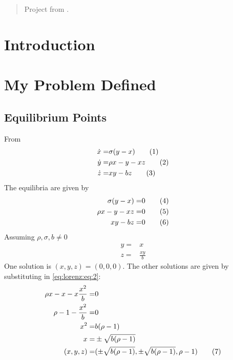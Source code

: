 \documentclass[]{article}
\title{}
\author{}
\newcommand\numberthis{\addtocounter{equation}{1}\tag{\theequation}}
\begin{document}
\maketitle

\begin{abstract}
Project  from \cite{ChaosBook}.
\end{abstract}

\tableofcontents

\section{Introduction}



\section{My Problem Defined}

\subsection{Equilibrium Points}
From \cite{lorenz1963deterministic}
\begin{align*}
	\dot{x} =& \sigma(y-x) \numberthis \label{eq:lorenz:1}\\
	\dot{y} =& \rho x -y - xz \numberthis \label{eq:lorenz:2}\\
	\dot{z} =& xy-bz \numberthis \label{eq:lorenz:3}
\end{align*}
The equilibria are given by
\begin{align*}
	\sigma(y-x) =& 0\numberthis \label{eq:lorenz:eq:1}\\
	\rho x -y - xz  =& 0\numberthis \label{eq:lorenz:eq:2}\\
	xy-bz =& 0\numberthis \label{eq:lorenz:eq:3}
\end{align*}
Assuming $\rho, \sigma, b \ne 0$
\begin{align*}
	y =& x\\
	z =& \frac{xy}{b}
\end{align*}
One solution is $(x,y,z)= (0,0,0)$. The other solutions are given by substituting in \eqref{eq:lorenz:eq:2}:
\begin{align*}
	\rho x - x-x \frac{x^2}{b} =& 0\\
	\rho -1 - \frac {x^2}{b} =& 0\\
	x^2 =& b(\rho-1)\\
	x =& \pm \sqrt{ b(\rho-1)}\\
	(x,y,z)=& (\pm \sqrt{ b(\rho-1)},\pm \sqrt{ b(\rho-1)},\rho-1) \numberthis \label{eq:lorenz:eq:eq}
\end{align*}
\end{document}
